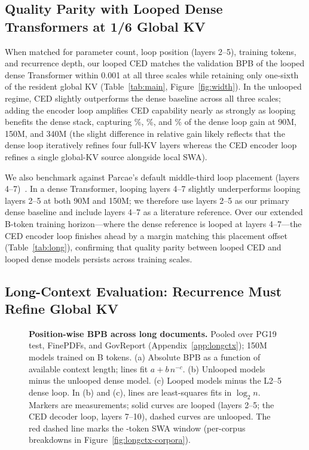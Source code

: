 \subsection{Quality Parity with Looped Dense Transformers at 1/6 Global KV}
\label{sec:res-dense}

When matched for parameter count, loop position (layers 2--5), training tokens, and recurrence depth, our looped CED matches the validation BPB of the looped dense Transformer within 0.001 at all three scales while retaining only one-sixth of the resident global KV (Table~\ref{tab:main}, Figure~\ref{fig:width}). In the unlooped regime, CED slightly outperforms the dense baseline across all three scales; adding the encoder loop amplifies CED capability nearly as strongly as looping benefits the dense stack, capturing \%, \%, and \% of the dense loop gain at 90M, 150M, and 340M (the slight difference in relative gain likely reflects that the dense loop iteratively refines four full-KV layers whereas the CED encoder loop refines a single global-KV source alongside local SWA).

We also benchmark against Parcae's default middle-third loop placement (layers 4--7)~\citep{parcae}. In a dense Transformer, looping layers 4--7 slightly underperforms looping layers 2--5 at both 90M and 150M; we therefore use layers 2--5 as our primary dense baseline and include layers 4--7 as a literature reference. Over our extended B-token training horizon—where the dense reference is looped at layers 4--7—the CED encoder loop finishes ahead by a margin matching this placement offset (Table~\ref{tab:long}), confirming that quality parity between looped CED and looped dense models persists across training scales.

\subsection{Long-Context Evaluation: Recurrence Must Refine Global KV}
\label{sec:res-longdoc}

\begin{figure}[t]
\centering
{}
\caption{\textbf{Position-wise BPB across long documents.} Pooled over PG19 test, FinePDFs, and GovReport (Appendix~\ref{app:longctx}); 150M models trained on B tokens. (a) Absolute BPB as a function of available context length; lines fit $a + b\,n^{-c}$. (b) Unlooped models minus the unlooped dense model. (c) Looped models minus the L2--5 dense loop. In (b) and (c), lines are least-squares fits in $\log_2 n$. Markers are measurements; solid curves are looped (layers 2--5; the CED decoder loop, layers 7--10), dashed curves are unlooped. The red dashed line marks the -token SWA window (per-corpus breakdowns in Figure~\ref{fig:longctx-corpora}).}
\label{fig:longctx}
\end{figure}

